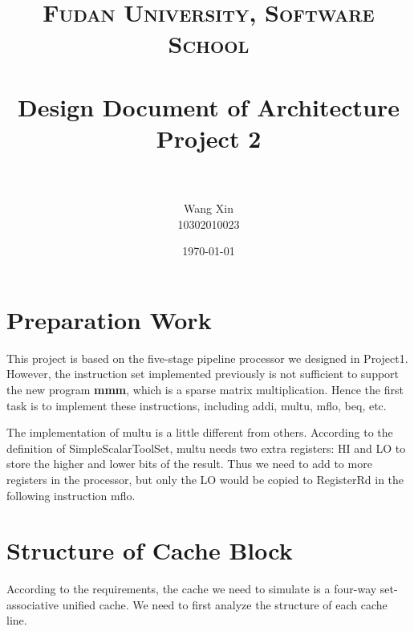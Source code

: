 \documentclass[paper=a4, fontsize=11pt]{scrartcl} %
\title{	
\normalfont \normalsize
\textsc{Fudan University, Software School} \\ [25pt] %
\horrule{0.5pt} \\[0.4cm] %
\huge Design Document of Architecture Project 2 \\ %
\horrule{2pt} \\[0.5cm] %
}
\author{Wang Xin\\10302010023} %
\date{\normalsize\today} %
\numberwithin{equation}{section} %
\numberwithin{figure}{section} %
\numberwithin{table}{section} %
\begin{document}
\maketitle %


\section{Preparation Work}

This project is based on the five-stage pipeline processor we designed in Project1. However, the instruction set implemented previously is not sufficient to support the new program \textbf{mmm}, which is a sparse matrix multiplication. Hence the first task is to implement these instructions, including addi, multu, mflo, beq, etc.

The implementation of multu is a little different from others. According to the definition of SimpleScalarToolSet, multu needs two extra registers: HI and LO to store the higher and lower bits of the result. Thus we need to add to more registers in the processor, but only the LO would be copied to RegisterRd in the following instruction mflo.



\section{Structure of Cache Block}

According to the requirements, the cache we need to simulate is a four-way set-associative unified cache. We need to first analyze the structure of each cache line.
\end{document}
